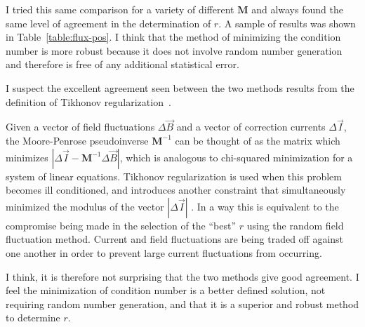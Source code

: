 I tried this same comparison for a variety of different $\bm{M}$ and
always found the same level of agreement in the determination of $r$.
A sample of results was shown in Table~\ref{table:flux-pos}.  I think
that the method of minimizing the condition number is more robust
because it does not involve random number generation and therefore is
free of any additional statistical error.

I suspect the excellent agreement seen between the two methods results
from the definition of Tikhonov
regularization~\cite{tikhonov2013numerical,tikhonov_book,svd,svd3}.

Given a vector of field fluctuations $\Delta\vec{B}$ and a vector of
correction currents $\Delta\vec{I}$, the Moore-Penrose pseudoinverse
$\bm{M}^{-1}$ can be thought of as the matrix which minimizes
$|\Delta\vec{I}-\bm{M}^{-1}\Delta\vec{B}|$, which is analogous to
chi-squared minimization for a system of linear equations.  Tikhonov
regularization is used when this problem becomes ill conditioned, and
introduces another constraint that simultaneously minimized the modulus of the vector
$|\Delta\vec{I}|$ . In a way this is equivalent to the compromise being
made in the selection of the ``best'' $r$ using the random field
fluctuation method.  Current and field fluctuations are being traded
off against one another in order to prevent large current fluctuations
from occurring.




I think, it is therefore not surprising that the two methods give good
agreement. I feel the minimization of condition number is a better
defined solution, not requiring random number generation, and that it
is a superior and robust method to determine $r$.



